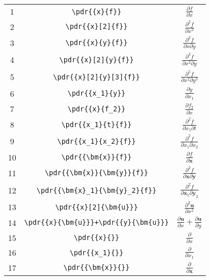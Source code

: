 \documentclass{jsarticle}
\begin{document}
\begin{table}[htpt]
\centering
\begin{tabular}{ccc}
1&	\verb|\pdr{{x}{f}}|					& $\displaystyle \frac{\partial f}{\partial x}$ \\[3mm]
2&	\verb|\pdr{{x}[2]{f}}|				& $\displaystyle \frac{\partial^2 f}{\partial x^2}$ \\[3mm]
3&	\verb|\pdr{{x}{y}{f}}|				& $\displaystyle \frac{\partial^2 f}{\partial x \partial y}$ \\[3mm]
4&	\verb|\pdr{{x}[2]{y}{f}}|			& $\displaystyle \frac{\partial^3 f}{\partial x^2 \partial y}$ \\[3mm]
5&	\verb|\pdr{{x}[2]{y}[3]{f}}|		& $\displaystyle \frac{\partial^5 f}{\partial x^2 \partial y^3}$ \\[3mm]
6&	\verb|\pdr{{x_1}{y}}|				& $\displaystyle \frac{\partial y}{\partial x_1}$ \\[3mm]
7&	\verb|\pdr{{x}{f_2}}|				& $\displaystyle \frac{\partial f_2}{\partial x}$ \\[3mm]
8&	\verb|\pdr{{x_1}{t}{f}}|			& $\displaystyle \frac{\partial^2 f}{\partial x_1 \partial t}$ \\[3mm]
9&	\verb|\pdr{{x_1}{x_2}{f}}|			& $\displaystyle \frac{\partial^2 f}{\partial x_1 \partial x_2}$ \\[3mm]
10&	\verb|\pdr{{\bm{x}}{f}}|			& $\displaystyle \frac{\partial f}{\partial \bm{x}}$ \\[3mm]
11&	\verb|\pdr{{\bm{x}}{\bm{y}}{f}}|	& $\displaystyle \frac{\partial^2 f}{\partial \bm{x} \partial \bm{y}}$ \\[3mm]
12&	\verb|\pdr{{\bm{x}_1}{\bm{y}_2}{f}}|& $\displaystyle \frac{\partial^2 f}{\partial \bm{x}_1 \partial \bm{y}_2}$ \\[3mm]
13&	\verb|\pdr{{x}[2]{\bm{u}}}|			& $\displaystyle \frac{\partial^2 \bm{u}}{\partial x^2}$ \\[3mm]
14&	\verb|\pdr{{x}{\bm{u}}}+\pdr{{y}{\bm{u}}}| & $\displaystyle \frac{\partial \bm{u}}{\partial x} + \frac{\partial \bm{u}}{\partial y}$ \\[3mm]
15&	\verb|\pdr{{x}{}}| 					& $\displaystyle \frac{\partial}{\partial x}$ \\[3mm]
16&	\verb|\pdr{{x_1}{}}|				& $\displaystyle \frac{\partial}{\partial x_1}$ \\[3mm]
17&	\verb|\pdr{{\bm{x}}{}}|				& $\displaystyle \frac{\partial}{\partial \bm{x}}$ \\[3mm]
\end{tabular}
\end{table}
\end{document}
